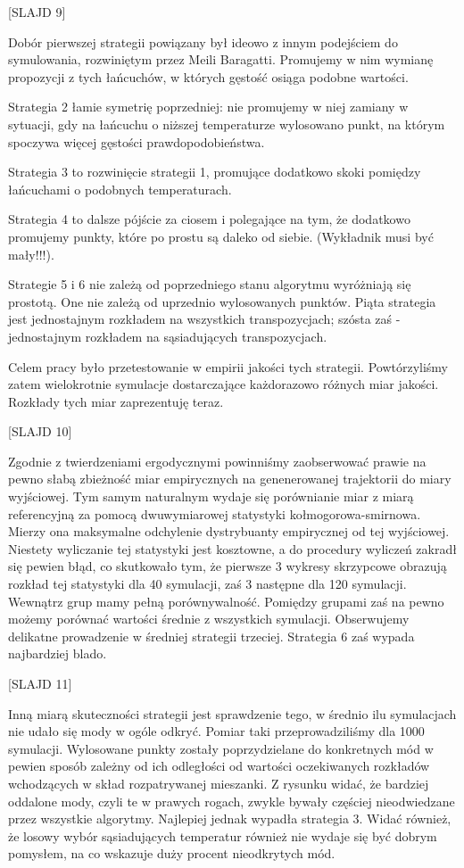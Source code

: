 [SLAJD 9]

Dobór pierwszej strategii powiązany był ideowo z innym podejściem do symulowania, rozwiniętym przez Meili Baragatti. Promujemy w nim wymianę propozycji z tych łańcuchów, w których gęstość osiąga podobne wartości.

Strategia 2 łamie symetrię poprzedniej: nie promujemy w niej zamiany w sytuacji, gdy na łańcuchu o niższej temperaturze wylosowano punkt, na którym spoczywa więcej gęstości prawdopodobieństwa.

Strategia 3 to rozwinięcie strategii 1, promujące dodatkowo skoki pomiędzy łańcuchami o podobnych temperaturach. 

Strategia 4 to dalsze pójście za ciosem i polegające na tym, że dodatkowo promujemy punkty, które po prostu są daleko od siebie. (Wykładnik musi być mały!!!). 

Strategie 5 i 6 nie zależą od poprzedniego stanu algorytmu wyróżniają się prostotą. One nie zależą od uprzednio wylosowanych punktów. Piąta strategia jest jednostajnym rozkładem na wszystkich transpozycjach; szósta zaś - jednostajnym rozkładem na sąsiadujących transpozycjach.

Celem pracy było przetestowanie w empirii jakości tych strategii. Powtórzyliśmy zatem wielokrotnie symulacje dostarczające każdorazowo różnych miar jakości. Rozkłady tych miar zaprezentuję teraz.

[SLAJD 10]

Zgodnie z twierdzeniami ergodycznymi powinniśmy zaobserwować prawie na pewno słabą zbieżność miar empirycznych na genenerowanej trajektorii do miary wyjściowej. Tym samym naturalnym wydaje się porównianie miar z miarą referencyjną za pomocą dwuwymiarowej statystyki kołmogorowa-smirnowa. Mierzy ona maksymalne odchylenie dystrybuanty empirycznej od tej wyjściowej. Niestety wyliczanie tej statystyki jest kosztowne, a do procedury wyliczeń zakradł się pewien błąd, co skutkowało tym, że pierwsze 3 wykresy skrzypcowe obrazują rozkład tej statystyki dla 40 symulacji, zaś 3 następne dla 120 symulacji. Wewnątrz grup mamy pełną porównywalność. Pomiędzy grupami zaś na pewno możemy porównać wartości średnie z wszystkich symulacji. Obserwujemy delikatne prowadzenie w średniej strategii trzeciej. Strategia 6 zaś wypada najbardziej blado.

[SLAJD 11]

Inną miarą skuteczności strategii jest sprawdzenie tego, w średnio ilu symulacjach nie udało się mody w ogóle odkryć. Pomiar taki przeprowadziliśmy dla 1000 symulacji. Wylosowane punkty zostały poprzydzielane do konkretnych mód w pewien sposób zależny od ich odległości od wartości oczekiwanych rozkładów wchodzących w skład rozpatrywanej mieszanki. Z rysunku widać, że bardziej oddalone mody, czyli te w prawych rogach, zwykle bywały częściej nieodwiedzane przez wszystkie algorytmy.  Najlepiej jednak wypadła strategia 3. Widać również, że losowy wybór sąsiadujących temperatur również nie wydaje się być dobrym pomysłem, na co wskazuje duży procent nieodkrytych mód. 

